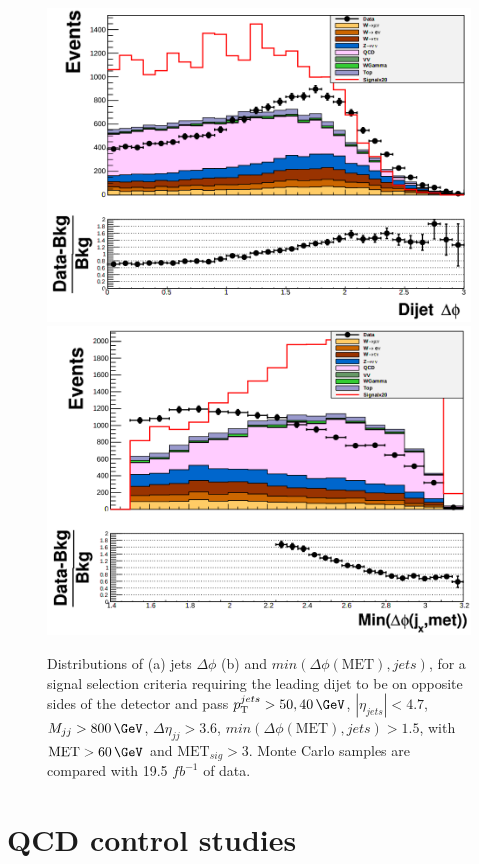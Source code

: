 \begin{figure}[!htb]
\vspace{-50px}
\centering
\includegraphics[width=0.45\linewidth]{Chapter06/QCD_VBFMET_Samples/Fail/JetsDeltaPhi.png} 
\includegraphics[width=0.45\linewidth]{Chapter06/QCD_VBFMET_Samples/Fail/JetsMet_MinDeltaPhi.png}
\caption[Distributions of jets $\Delta\phi$ and $min(\Delta\phi(\text{MET}),jets)$, for a signal selection criteria requiring the leading dijet to be on opposite sides of the detector and pass $\pt^{jets}>50,40\,\GeV$, $|\eta_{jets}|<4.7$, $M_{jj}>800\,\GeV$, $\Delta\eta_{jj}>3.6$, $min(\Delta\phi(\text{MET}),jets)>1.5$, with $\text{MET}>60\,\GeV$ and $\text{MET}_{sig}>3$.]
{Distributions of (a) jets $\Delta\phi$ (b) and $min(\Delta\phi(\text{MET}),jets)$, for a signal selection criteria requiring the leading dijet to be on opposite sides of the detector and pass $\pt^{jets}>50,40\,\GeV$, $|\eta_{jets}|<4.7$, $M_{jj}>800\,\GeV$, $\Delta\eta_{jj}>3.6$, $min(\Delta\phi(\text{MET}),jets)>1.5$, with $\text{MET}>60\,\GeV$ and $\text{MET}_{sig}>3$. Monte Carlo samples are compared with 19.5 $fb^{-1}$ of data. \cite{ARTICLE:PatrickPlots}}
\label{FIGURE:PreparationParkedDataAnalysis_QCDVBFMET_PreSectionFail}
\end{figure}

\clearpage

\section{QCD control studies}



